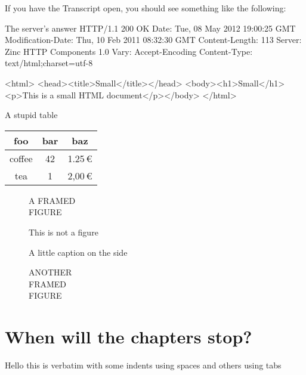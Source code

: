 \documentclass[openany]{sbabook}
\begin{document}
If you have the Transcript open, you should see something like the following:

\begin{script}{The server's answer}
HTTP/1.1 200 OK
Date: Tue, 08 May 2012 19:00:25 GMT
Modification-Date: Thu, 10 Feb 2011 08:32:30 GMT
Content-Length: 113
Server: Zinc HTTP Components 1.0
Vary: Accept-Encoding
Content-Type: text/html;charset=utf-8

<html>
<head><title>Small</title></head>
<body><h1>Small</h1><p>This is a small HTML document</p></body>
</html>
\end{script}

\begin{table}[p]
    \begin{sidecaption}{A stupid table}
        \begin{tabular}{ccc}
            \toprule
            foo & bar & baz \\
            \midrule
            coffee & 42 & 1.25\,€ \\
            tea & 1 & 2,00\,€ \\
            \bottomrule
        \end{tabular}
    \end{sidecaption}
\end{table}

\begin{figure}[p]
    \begin{framed}
        A FRAMED\\
        FIGURE
    \end{framed}
    \caption{This is not a figure}
\end{figure}

\begin{figure}[p]
    \begin{sidecaption}{A little caption on the side}
        \begin{shaded}
            ANOTHER\\
            FRAMED\\
            FIGURE
        \end{shaded}
    \end{sidecaption}
\end{figure}


\chapter{When will the chapters stop?}

\begin{boxedverbatim}
Hello
  this is verbatim
with some indents using spaces
	and others using tabs
\end{boxedverbatim}
\end{document}

